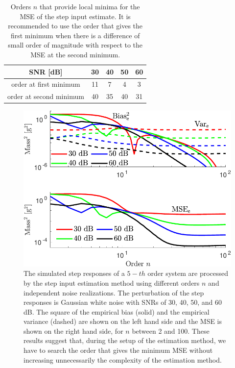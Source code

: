 \begin{table}[!ht]
\caption{ Orders $n$ that provide local minima for the MSE of the step input estimate. It is recommended to use the order that gives the first minimum when there is a difference of small order of magnitude with respect to the MSE at the second minimum.} 
\label{Tbl:orders} 
\centering
\begin{tabular}{c|c c c c} 
\hline
SNR [dB] & 30 & 40 & 50 & 60 \\
\hline
order at first minimum & 11 & 7 & 4 & 3 \\ 
order at second minimum & 40 & 35 & 40 & 31 \\
\hline
\end{tabular}
\end{table}

\begin{figure}[!htbp]
\centering
\includegraphics[width=\columnwidth]{./ChapterExperimentalValidation/fig/Fig_4.pdf} 
\caption{ \label{fig:msee_vs_n_sim} 
The simulated step responses of a $\mathrm{5-}th$ order system are processed by the step input estimation method using different orders $n$ and independent noise realizations. 
The perturbation of the step responses is Gaussian white noise with SNRs of 30, 40, 50, and 60 dB.
The square of the empirical bias (solid) and the empirical variance (dashed) are shown on the left hand side and the MSE is shown on the right hand side, for $n$ between 2 and 100.
These results suggest that, during the setup of the estimation method, we have to search the order that gives the minimum MSE without increasing unnecessarily the complexity of the estimation method.  }
\end{figure}


